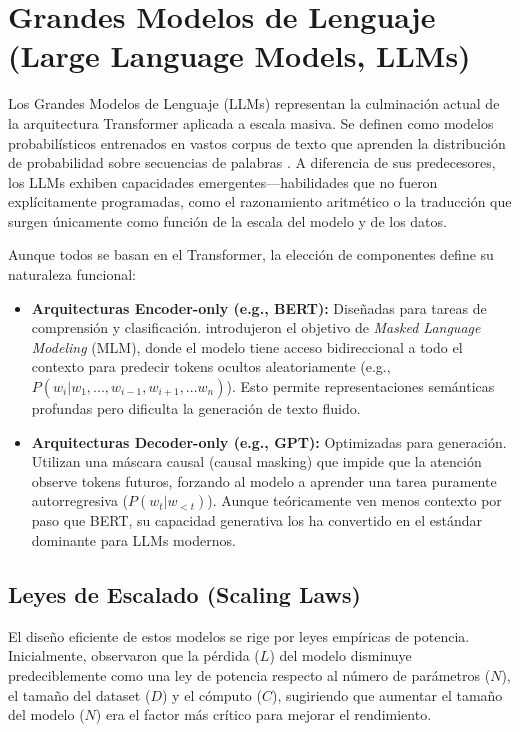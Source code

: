 \documentclass[11pt, a4paper]{article}
\begin{document}
\section{Grandes Modelos de Lenguaje (Large Language Models, LLMs)}
Los Grandes Modelos de Lenguaje (LLMs) representan la culminación actual de la arquitectura Transformer aplicada a escala masiva. Se definen como modelos probabilísticos entrenados en vastos corpus
de texto que aprenden la distribución de probabilidad sobre secuencias de palabras \cite{atkinson2025}. A diferencia de sus predecesores, los LLMs exhiben capacidades emergentes—habilidades que
no fueron explícitamente programadas, como el razonamiento aritmético o la traducción que surgen únicamente como función de la escala del modelo y de los datos.

Aunque todos se basan en el Transformer, la elección de componentes define su naturaleza funcional:

\begin{itemize}
    \item \textbf{Arquitecturas Encoder-only (e.g., BERT):} Diseñadas para tareas de comprensión y clasificación. \cite{devlin_bert_nodate} introdujeron el objetivo de 
    \textit{Masked Language Modeling} (MLM), donde el modelo tiene acceso bidireccional a todo el contexto para predecir tokens ocultos aleatoriamente (e.g., $P(w_i | w_1, ..., w_{i-1}, w_{i+1}, ... w_n)$).
    Esto permite representaciones semánticas profundas pero dificulta la generación de texto fluido.
    
    \item \textbf{Arquitecturas Decoder-only (e.g., GPT):} Optimizadas para generación. Utilizan una máscara causal (causal masking) que impide que la atención observe tokens futuros, forzando al modelo
    a aprender una tarea puramente autorregresiva ($P(w_t | w_{<t})$). Aunque teóricamente ven menos contexto por paso que BERT, su capacidad generativa los ha convertido en el estándar dominante para 
    LLMs modernos.
\end{itemize}


\subsection{Leyes de Escalado (Scaling Laws)}

El diseño eficiente de estos modelos se rige por leyes empíricas de potencia. Inicialmente, \cite{kaplan_scaling_2020} observaron que la pérdida ($L$) del modelo disminuye predeciblemente como una ley de
potencia respecto al número de parámetros ($N$), el tamaño del dataset ($D$) y el cómputo ($C$), sugiriendo que aumentar el tamaño del modelo ($N$) era el factor más crítico para mejorar el rendimiento.
\end{document}
